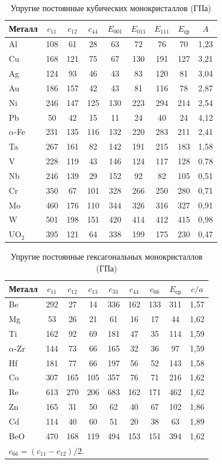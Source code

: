 \begin{table}[ht]
\centering
\caption{Упругие постоянные кубических монокристаллов (ГПа)}\label{tab:cubic-elastic}
\small
\begin{tabular}{@{}lcccccccc@{}}
\toprule
Металл & $c_{11}$ & $c_{12}$ & $c_{44}$ & $E_{001}$ & $E_{011}$ & $E_{111}$ & $E_\text{ср}$ & $A$\\
\midrule
Al & 108 & 61 & 28 & 63 & 72 & 76 & 70 & 1,23\\
Cu & 168 & 121 & 75 & 67 & 130 & 191 & 127 & 3,21\\
Ag & 124 & 93 & 46 & 43 & 83 & 120 & 81 & 3,04\\
Au & 186 & 157 & 42 & 43 & 81 & 116 & 78 & 2,87\\
Ni & 246 & 147 & 125 & 130 & 223 & 294 & 214 & 2,54\\
Pb & 50 & 42 & 15 & 11 & 24 & 40 & 24 & 4,12\\
$\alpha$-Fe & 231 & 135 & 116 & 132 & 220 & 283 & 211 & 2,41\\
Ta & 267 & 161 & 82 & 142 & 191 & 215 & 183 & 1,58\\
V & 228 & 119 & 43 & 146 & 124 & 117 & 128 & 0,78\\
Nb & 246 & 139 & 29 & 152 & 92 & 82 & 105 & 0,51\\
Cr & 350 & 67 & 101 & 328 & 266 & 250 & 280 & 0,71\\
Mo & 460 & 176 & 110 & 344 & 326 & 316 & 327 & 0,91\\
W & 501 & 198 & 151 & 420 & 414 & 412 & 415 & 0,98\\
UO$_2$ & 395 & 121 & 64 & 338 & 199 & 175 & 230 & 0,47\\
\bottomrule
\end{tabular}
\end{table}

\begin{table}[ht]
\centering
\caption{Упругие постоянные гексагональных монокристаллов (ГПа)}\label{tab:hex-elastic}
\small
\begin{tabular}{@{}lcccccccc@{}}
\toprule
Металл & $c_{11}$ & $c_{12}$ & $c_{13}$ & $c_{33}$ & $c_{44}$ & $c_{66}$ & $E_\text{ср}$ & $c/a$\\
\midrule
Be & 292 & 27 & 14 & 336 & 162 & 133 & 311 & 1,57\\
Mg & 53 & 26 & 21 & 61 & 16 & 17 & 44 & 1,62\\
Ti & 162 & 92 & 69 & 181 & 47 & 35 & 114 & 1,59\\
$\alpha$-Zr & 144 & 73 & 66 & 165 & 32 & 36 & 97 & 1,59\\
Hf & 181 & 77 & 66 & 197 & 56 & 52 & 143 & 1,58\\
Co & 307 & 165 & 105 & 357 & 76 & 71 & 216 & 1,62\\
Re & 613 & 270 & 206 & 683 & 162 & 171 & 462 & 1,62\\
Zn & 165 & 31 & 50 & 62 & 40 & 67 & 102 & 1,86\\
Cd & 114 & 40 & 60 & 51 & 20 & 38 & 63 & 1,89\\
BeO & 470 & 168 & 119 & 494 & 153 & 151 & 394 & 1,62\\
\bottomrule
\multicolumn{9}{l}{\footnotesize $c_{66}=(c_{11}-c_{12})/2$.}
\end{tabular}
\end{table}

